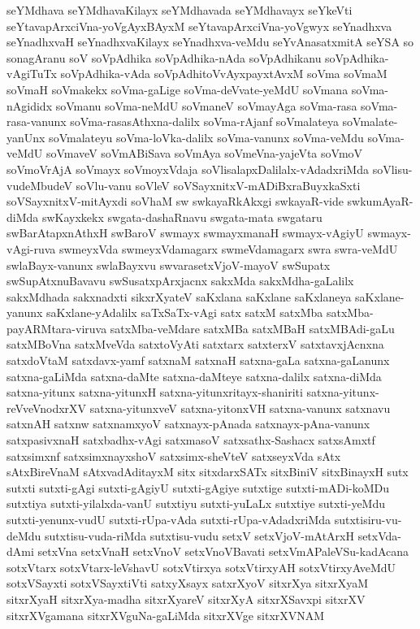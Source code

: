 {seYMdhava
seYMdhavaKilayx
seYMdhavada
seYMdhavayx
seYkeVti
seYtavapArxciVna-yoVgAyxBAyxM
seYtavapArxciVna-yoVgwyx
seYnadhxva
seYnadhxvaH
seYnadhxvaKilayx
seYnadhxva-veMdu
seYvAnasatxmitA
seYSA
so
sonagAranu
soV
soVpAdhika
soVpAdhika-nAda
soVpAdhikanu
soVpAdhika-vAgiTuTx
soVpAdhika-vAda
soVpAdhitoVvAyxpayxtAvxM
soVma
soVmaM
soVmaH
soVmakekx
soVma-gaLige
soVma-deVvate-yeMdU
soVmana
soVma-nAgididx
soVmanu
soVma-neMdU
soVmaneV
soVmayAga
soVma-rasa
soVma-rasa-vanunx
soVma-rasasAthxna-dalilx
soVma-rAjanf
soVmalateya
soVmalate-yanUnx
soVmalateyu
soVma-loVka-dalilx
soVma-vanunx
soVma-veMdu
soVma-veMdU
soVmaveV
soVmABiSava
soVmAya
soVmeVna-yajeVta
soVmoV
soVmoVrAjA
soVmayx
soVmoyxVdaja
soVlisalapxDalilalx-vAdadxriMda
soVlisu-vudeMbudeV
soVlu-vanu
soVleV
soVSayxnitxV-mADiBxraBuyxkaSxti
soVSayxnitxV-mitAyxdi
soVhaM
sw
swkayaRkAkxgi
swkayaR-vide
swkumAyaR-diMda
swKayxkekx
swgata-dashaRnavu
swgata-mata
swgataru
swBarAtapxnAthxH
swBaroV
swmayx
swmayxmanaH
swmayx-vAgiyU
swmayx-vAgi-ruva
swmeyxVda
swmeyxVdamagarx
swmeVdamagarx
swra
swra-veMdU
swlaBayx-vanunx
swlaBayxvu
swvarasetxVjoV-mayoV
swSupatx
swSupAtxnuBavavu
swSusatxpArxjacnx
sakxMda
sakxMdha-gaLalilx
sakxMdhada
sakxnadxti
sikxrXyateV
saKxlana
saKxlane
saKxlaneya
saKxlane-yanunx
saKxlane-yAdalilx
saTxSaTx-vAgi
satx
satxM
satxMba
satxMba-payARMtara-viruva
satxMba-veMdare
satxMBa
satxMBaH
satxMBAdi-gaLu
satxMBoVna
satxMveVda
satxtoVyAti
satxtarx
satxterxV
satxtavxjAcnxna
satxdoVtaM
satxdavx-yamf
satxnaM
satxnaH
satxna-gaLa
satxna-gaLanunx
satxna-gaLiMda
satxna-daMte
satxna-daMteye
satxna-dalilx
satxna-diMda
satxna-yitunx
satxna-yitunxH
satxna-yitunxritayx-shaniriti
satxna-yitunx-reVveVnodxrXV
satxna-yitunxveV
satxna-yitonxVH
satxna-vanunx
satxnavu
satxnAH
satxnw
satxnamxyoV
satxnayx-pAnada
satxnayx-pAna-vanunx
satxpasivxnaH
satxbadhx-vAgi
satxmasoV
satxsathx-Sashacx
satxsAmxtf
satxsimxnf
satxsimxnayxshoV
satxsimx-sheVteV
satxseyxVda
sAtx
sAtxBireVnaM
sAtxvadAditayxM
sitx
sitxdarxSATx
sitxBiniV
sitxBinayxH
sutx
sutxti
sutxti-gAgi
sutxti-gAgiyU
sutxti-gAgiye
sutxtige
sutxti-mADi-koMDu
sutxtiya
sutxti-yilalxda-vanU
sutxtiyu
sutxti-yuLaLx
sutxtiye
sutxti-yeMdu
sutxti-yenunx-vudU
sutxti-rUpa-vAda
sutxti-rUpa-vAdadxriMda
sutxtisiru-vu-deMdu
sutxtisu-vuda-riMda
sutxtisu-vudu
setxV
setxVjoV-mAtArxH
setxVda-dAmi
setxVna
setxVnaH
setxVnoV
setxVnoVBavati
setxVmAPaleVSu-kadAcana
sotxVtarx
sotxVtarx-leVshavU
sotxVtirxya
sotxVtirxyAH
sotxVtirxyAveMdU
sotxVSayxti
sotxVSayxtiVti
satxyXsayx
satxrXyoV
sitxrXya
sitxrXyaM
sitxrXyaH
sitxrXya-madha
sitxrXyareV
sitxrXyA
sitxrXSavxpi
sitxrXV
sitxrXVgamana
sitxrXVguNa-gaLiMda
sitxrXVge
sitxrXVNAM
}
